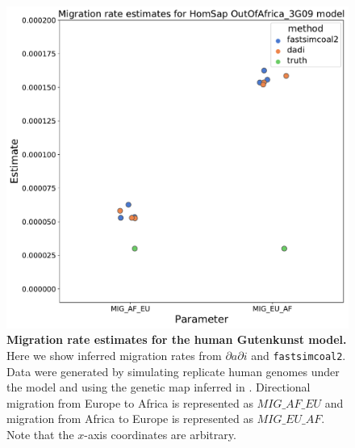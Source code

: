 \documentclass[12pt,halfline,a4paper]{ouparticle}
\newcommand{\dadi}{$\partial a \partial i$\xspace}
\newcommand{\fastsimcoal}{\texttt{fastsimcoal2}\xspace}
\begin{document}
\begin{figure}
\begin{center}
\includegraphics[width=0.8\linewidth]{display_items/homsap_migration_rates.pdf}
\caption{\textbf{Migration rate estimates for the human Gutenkunst model.}
Here we show inferred migration rates from \dadi and \fastsimcoal.
Data were generated by simulating
replicate human genomes under the \cite{gutenkunst2009inferring} model and using the genetic map
inferred in \cite{international2007second}.
Directional migration from Europe to Africa is represented as $MIG\_AF\_EU$ and
migration from Africa to Europe is represented as $MIG\_EU\_AF$.
Note that the $x$-axis coordinates are arbitrary.}
\label{fig:homsap_mig_rates}
\end{center}
\end{figure}
\end{document}
